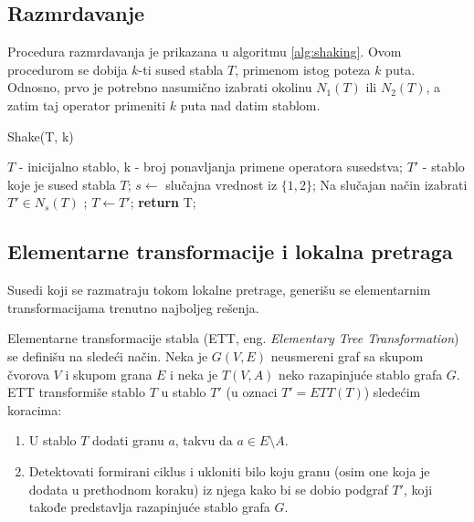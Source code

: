 \documentclass[main.tex]{subfiles}
\begin{document}
\subsection{Razmrdavanje}
\label{sec:shaking}

Procedura razmrdavanja je prikazana u algoritmu \autoref{alg:shaking}. Ovom procedurom se dobija $k$-ti sused stabla $T$, primenom istog poteza $k$ puta. Odnosno, prvo je potrebno nasumično izabrati okolinu $N_1(T)$ ili $N_2(T)$, a zatim taj operator primeniti $k$ puta nad datim stablom.

\begin{algorithm}
\caption{Shake(T, k)}
\label{alg:shaking}
  \begin{algorithmic}[1]
    \INPUT $T$ - inicijalno stablo, k - broj ponavljanja primene operatora susedstva;
    \OUTPUT $T'$ - stablo koje je sused stabla $T$;
    \STATE $s \leftarrow$ slučajna vrednost iz $\{1,2\}$;
        \STATE Na slučajan način izabrati $T' \in N_s(T)$ ;
        \STATE $T \leftarrow T'$;
    \ENDFOR
    \STATE \textbf{return} T;
  \end{algorithmic}
\end{algorithm}

\subsection{Elementarne transformacije i lokalna pretraga}
\label{sec:ETT}

Susedi koji se razmatraju tokom lokalne pretrage, generišu se elementarnim transformacijama trenutno najboljeg rešenja.

Elementarne transformacije stabla (ETT, eng. \textit{Elementary Tree Transformation}) se definišu na sledeći način. Neka je $G(V, E)$ neusmereni graf sa skupom čvorova $V$ i skupom grana $E$ i neka je $T(V, A)$ neko razapinjuće stablo grafa $G$. ETT transformiše stablo $T$ u stablo $T'$ (u oznaci $T' = ETT(T)$) sledećim koracima:

\begin{enumerate}
    \item U stablo $T$ dodati granu $a$, takvu da $a \in E \setminus A$.
    \item Detektovati formirani ciklus i ukloniti bilo koju granu (osim one koja je dodata u prethodnom koraku) iz njega kako bi se dobio podgraf $T'$, koji takođe predstavlja razapinjuće stablo grafa $G$.
\end{enumerate}
\end{document}
